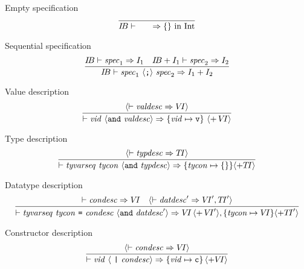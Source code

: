 \begin{inference-rule}{Empty specification}
\begin{equation}\label{rule:dynamic-modules:empty-specification}
\vcenter{\infer{\IB\ts\emptyspec\ra\emptymap{\rm\ in}\ \Int}
  {}}
\end{equation}
\end{inference-rule}

\begin{inference-rule}{Sequential specification}
\begin{equation}\label{rule:dynamic-modules:sequential-spec}
\vcenter{\infer{\IB\ts\seqspec\ra\plusmap{\I_{1}}{\I_{2}}}
  {\IB\ts\spec_{1}\ra\I_{1}
    & \IB+\I_{1}\ts\spec_{2}\ra\I_{2}}}
\end{equation}
\end{inference-rule}


\begin{inference-rule}{Value description}
\begin{equation}\label{rule:dynamic-modules:value-description}
\vcenter{\infer{\ts\vid\ \optional{\AND\ \valdesc}\ra
       \{\vid\mapsto\isv\}\ \optional{+\,\VI}}
  {\optional{\ts\valdesc\ra\VI}}}
\end{equation}
\end{inference-rule}

\begin{inference-rule}{Type description}
\begin{equation}\label{rule:dynamic-modules:type-description}
\vcenter{\infer{\ts\typdescription\ra\{\tycon\mapsto\emptymap\}\optional{+\TI}}
  {\optional{\ts\typdesc\ra\TI}}}
\end{equation}
\end{inference-rule}

\begin{inference-rule}{Datatype description}
\begin{equation}\label{rule:dynamic-modules:datatype-description}
\vcenter{\infer{\ts\datdescriptiona\ra\VI\,\optional{+\,\VI'}, \{\tycon\mapsto\VI\}\optional{+\TI'}}
  {\ts\condesc\ra\VI
    & \optional{\ts\datdesc'\ra\VI',\TI'}}}
\end{equation}
\end{inference-rule}

\begin{inference-rule}{Constructor description}
\begin{equation}\label{rule:dynamic-modules:constructor-description}
\vcenter{\infer{\ts\shortconviddesc\ra\{\vid\mapsto\isc\}\,\optional{+\VI}}
  {\optional{\ts\condesc\ra\VI}}}
\end{equation}
\end{inference-rule}

